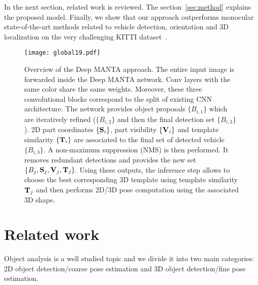 \documentclass[10pt,twocolumn,letterpaper]{article}
\begin{document}
In the next section, related work is reviewed. The section~\ref{sec:method} explains the proposed model. Finally, we show that our approach outperforms monocular state-of-the-art methods related to vehicle detection, orientation and 3D localization on the very challenging KITTI dataset~\cite{kitti}.

\begin{figure*}[ht]
\texttt{[image: global19.pdf]}
\centering
\vspace{1mm}
\caption{Overview of the Deep MANTA approach. The entire input image is forwarded inside the Deep MANTA network. Conv layers with the same color share the same weights. Moreover, these three convolutional blocks correspond to the split of existing CNN architecture. The network provides object proposals $\{B_{i,1}\}$ which are iteratively refined ($\{B_{i,2}\}$ and then the final detection set $\{B_{i,3}\}$). 2D part coordinates $\{\bold{S}_i\}$, part visibility $\{\bold{V}_i\}$ and template similarity $\{\bold{T}_i\}$ are associated to the final set of detected vehicle $\{B_{i,3}\}$. A non-maximum suppression (NMS) is then performed. It removes redundant detections and provides the new set $\{B_{j},\bold{S}_j,\bold{V}_j,\bold{T}_j\}$. Using these outputs, the inference step allows to choose the best corresponding 3D template using template similarity $\bold{T}_j$ and then performs 2D/3D pose computation using the associated 3D shape.}
\label{fig:shapercnn}


\end{figure*}


\section{Related work}
\label{sec:rw}

Object analysis is a well studied topic and we divide it into two main categories: 2D object detection/coarse pose estimation and 3D object detection/fine pose estimation.
\end{document}
